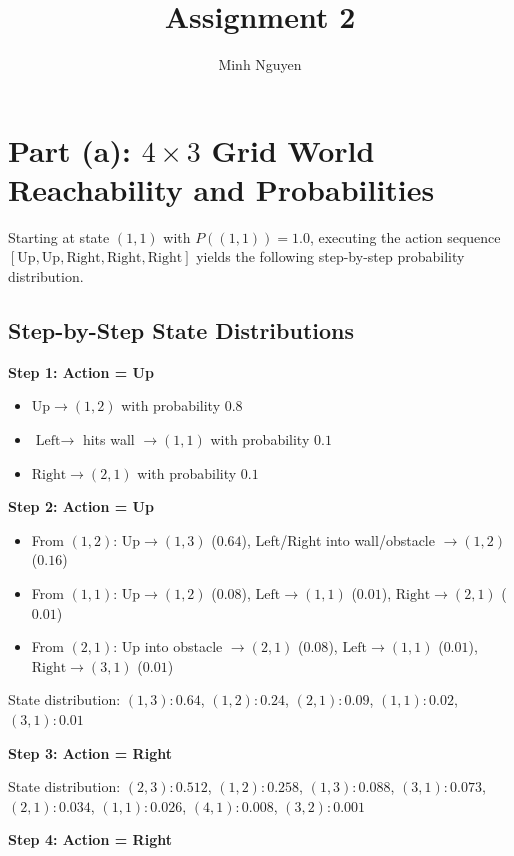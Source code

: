 \documentclass[11pt]{article}
\title{Assignment 2}
\author{Minh Nguyen}
\date{}
\begin{document}
\maketitle

\section*{Part (a): $4 \times 3$ Grid World Reachability and Probabilities}

Starting at state $(1,1)$ with $P((1,1)) = 1.0$, executing the action sequence
$[\text{Up}, \text{Up}, \text{Right}, \text{Right}, \text{Right}]$ yields the following
step-by-step probability distribution.

\subsection*{Step-by-Step State Distributions}

\textbf{Step 1: Action = Up}
\begin{itemize}[nosep]
  \item $\text{Up} \rightarrow (1,2)$ with probability $0.8$
  \item $\text{Left} \rightarrow$ hits wall $\rightarrow (1,1)$ with probability $0.1$
  \item $\text{Right} \rightarrow (2,1)$ with probability $0.1$
\end{itemize}

\textbf{Step 2: Action = Up}
\begin{itemize}[nosep]
  \item From $(1,2)$: $\text{Up} \to (1,3)$ ($0.64$), Left/Right into wall/obstacle $\to (1,2)$ ($0.16$)
  \item From $(1,1)$: $\text{Up} \to (1,2)$ ($0.08$), $\text{Left} \to (1,1)$ ($0.01$), $\text{Right} \to (2,1)$ ($0.01$)
  \item From $(2,1)$: Up into obstacle $\to (2,1)$ ($0.08$), $\text{Left} \to (1,1)$ ($0.01$), $\text{Right} \to (3,1)$ ($0.01$)
\end{itemize}
State distribution: $(1,3): 0.64$, $(1,2): 0.24$, $(2,1): 0.09$, $(1,1): 0.02$, $(3,1): 0.01$

\textbf{Step 3: Action = Right}

State distribution: $(2,3): 0.512$, $(1,2): 0.258$, $(1,3): 0.088$, $(3,1): 0.073$,
$(2,1): 0.034$, $(1,1): 0.026$, $(4,1): 0.008$, $(3,2): 0.001$

\textbf{Step 4: Action = Right}
\end{document}
